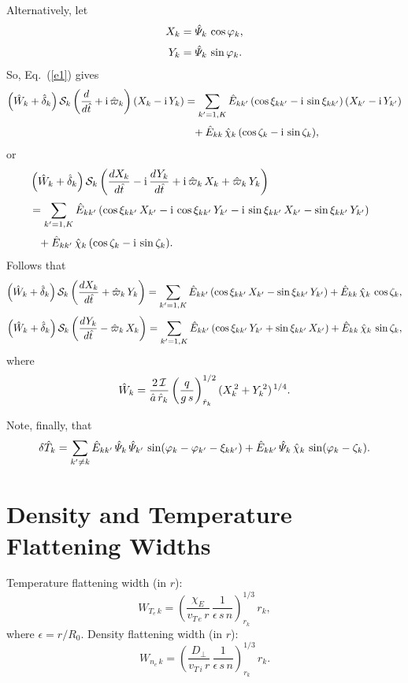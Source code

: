 \documentclass[12pt]{article}
\begin{document}
Alternatively, let
\begin{align}
X_k &= \hat{\mit\Psi}_k\,\cos\varphi_k,\\[0.5ex]
Y_k &= \hat{\mit\Psi}_k\,\sin\varphi_k.
\end{align}
So, Eq.~(\ref{e1}) gives
\begin{align}
\left(\hat{W}_k +\hat{\delta}_k\right){\cal S}_k\left(\frac{d}{d\hat{t}} + {\rm i}\,\hat{\varpi}_k\right)(X_k - {\rm i}\,Y_k)&=
\sum_{k'=1,K}\hat{E}_{kk'}\,(\cos\xi_{kk'} - {\rm i}\,\sin\xi_{kk'})\,(X_{k'} - {\rm i}\,Y_{k'})\nonumber\\[0.5ex]
&\phantom{=}+ \hat{E}_{kk}\,\hat{\chi}_k\,(\cos\zeta_k - {\rm i }\,\sin\zeta_k),
\end{align}
or
\begin{align}
&\left(\hat{W}_k +\hat{\delta}_k\right){\cal S}_k\left(\frac{dX_k}{d\hat{t}} - {\rm i}\,\frac{dY_k}{d\hat{t}} + {\rm i}\,\hat{\varpi}_k\,X_k
+\hat{\varpi}_k\,Y_k\right)&\nonumber\\[0.5ex]
&= \sum_{k'=1,K}\hat{E}_{kk'}\,(\cos\xi_{kk'}\,X_{k'} -{\rm i}\,\cos\xi_{kk'}\,Y_{k'}
-{\rm i}\,\sin\xi_{kk'}\,X_{k'} -\sin\xi_{kk'}\,Y_{k'})\nonumber\\[0.5ex]
&\phantom{=} + \hat{E}_{kk'}\,\hat{\chi}_k\,(\cos\zeta_k - {\rm i}\,\sin\zeta_k).
\end{align}
Follows that
\begin{align}
\left(\hat{W}_k +\hat{\delta}_k\right){\cal S}_k\left(\frac{dX_k}{d\hat{t}} 
+\hat{\varpi}_k\,Y_k\right)= \sum_{k'=1,K}\hat{E}_{kk'}\,(\cos\xi_{kk'}\,X_{k'}  -\sin\xi_{kk'}\,Y_{k'}) + \hat{E}_{kk}\,\hat{\chi}_k\,\cos\zeta_k,\\[0.5ex]
\left(\hat{W}_k +\hat{\delta}_k\right){\cal S}_k\left(\frac{dY_k}{d\hat{t}} -\hat{\varpi}_k\,X_k\right)
= \sum_{k'=1,K}\hat{E}_{kk'}\,(\cos\xi_{kk'}\,Y_{k'}
+\sin\xi_{kk'}\,X_{k'}) + \hat{E}_{kk}\,\hat{\chi}_k\,\sin\zeta_k,
\end{align}
where
\begin{equation}\label{e23}
\hat{W}_k =\frac{2\,{\cal I}}{\hat{a}\,\hat{r}_k}\left(\frac{q}{g\,s}\right)^{1/2}_{\hat{r}_k} (X_k^{\,2} + Y_k^{\,2})^{\,1/4}.
\end{equation}

Note, finally, that
\begin{equation}
\delta \hat{T}_k = \sum_{k'\neq k} \hat{E}_{kk'}\,\hat{\mit\Psi}_k\,\hat{\mit\Psi}_{k'}\,\sin(\varphi_k-\varphi_{k'}-\xi_{kk'}) + \hat{E}_{kk'}\,\hat{\mit\Psi}_k\,\hat{\chi}_k\,\sin(\varphi_k-\zeta_k).
\end{equation}

\section{Density and Temperature Flattening Widths}
Temperature flattening width (in $r$):
\begin{equation}
W_{T_e\,k} = \left(\frac{\chi_{E}}{v_{T\,e}\,r}\,\frac{1}{\epsilon\,s\,n}\right)^{1/3}_{r_k}\,r_k,
\end{equation}
where $\epsilon= r/R_0$. Density flattening width (in $r$):
\begin{equation}
W_{n_e\,k} = \left(\frac{D_\perp}{v_{T\,i}\,r}\,\frac{1}{\epsilon\,s\,n}\right)^{1/3}_{r_k}\,r_k.
\end{equation}
\end{document}
